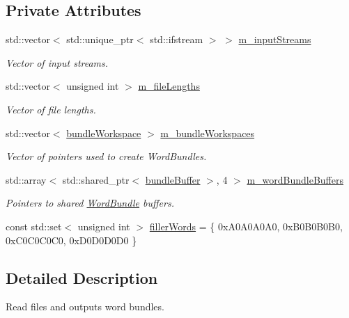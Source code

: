 \subsection*{Private Attributes}
\begin{DoxyCompactItemize}
\item 
std\+::vector$<$ std\+::unique\+\_\+ptr$<$ std\+::ifstream $>$ $>$ \hyperlink{class_file_reader_a8dfdb072d4bb1052a52d7be93fb44f07}{m\+\_\+input\+Streams}
\begin{DoxyCompactList}\small\item\em Vector of input streams. \end{DoxyCompactList}\item 
std\+::vector$<$ unsigned int $>$ \hyperlink{class_file_reader_a7269438e7187e9abbdde1361a46d1fa6}{m\+\_\+file\+Lengths}
\begin{DoxyCompactList}\small\item\em Vector of file lengths. \end{DoxyCompactList}\item 
std\+::vector$<$ \hyperlink{class_file_reader_a7fb625dc45cee3256d37cc19c65cad86}{bundle\+Workspace} $>$ \hyperlink{class_file_reader_ab59c633bc2943dcea7c977585e7e48b3}{m\+\_\+bundle\+Workspaces}
\begin{DoxyCompactList}\small\item\em Vector of pointers used to create Word\+Bundles. \end{DoxyCompactList}\item 
std\+::array$<$ std\+::shared\+\_\+ptr$<$ \hyperlink{class_file_reader_ac755c1e271610c2c12a7fc5b55cc048b}{bundle\+Buffer} $>$, 4 $>$ \hyperlink{class_file_reader_a038d1362d7e0458b3450ab8584eab688}{m\+\_\+word\+Bundle\+Buffers}
\begin{DoxyCompactList}\small\item\em Pointers to shared \hyperlink{class_word_bundle}{Word\+Bundle} buffers. \end{DoxyCompactList}\item 
const std\+::set$<$ unsigned int $>$ \hyperlink{class_file_reader_a7a0bb5e7cb117f6a415f005665893509}{filler\+Words} = \{ 0x\+A0\+A0\+A0\+A0, 0x\+B0\+B0\+B0\+B0, 0x\+C0\+C0\+C0\+C0, 0x\+D0\+D0\+D0\+D0 \}
\end{DoxyCompactItemize}


\subsection{Detailed Description}
Read files and outputs word bundles. 

